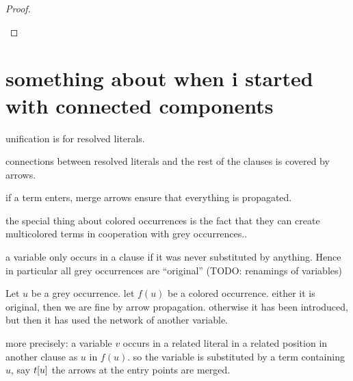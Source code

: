\documentclass[,%
	paper=a4,%
	DIV11, %
	twoside=false,%
	liststotoc,
	bibtotoc,
	draft=false,%
	numbers=noendperiod
]{scrartcl}
\begin{document}
\begin{proof}
\begin{description}
\begin{comment}
						We distinguish based on the shape $s$:
						\begin{itemize}
							\item $s$ is a grey or $\Delta$-colored term containing a $\Delta$-term.
								Then a $\Delta$-term is introduced into a $\Gamma$-term by means of unification, so by the respective case of the proof, there is an arrow from an appropriate lifting variable to~$t$.

							\item $s$ is a multicolored $\Gamma$-term.
								Then by Remark~\substremarkref, we can assume that an appropriate arrow pointing to $t$ exists.
						\end{itemize}
					\item $t$ is a $\Gamma$-term containing a $\Delta$-term.
				\end{itemize}
			\end{comment}


	\end{description}

\end{proof}

\section*{something about when i started with connected components}

unification is for resolved literals.

connections between resolved literals and the rest of the clauses is covered by arrows.

if a term enters, merge arrows ensure that everything is propagated.

the special thing about colored occurrences is the fact that they can create multicolored terms in cooperation with grey occurrences..

a variable only occurs in a clause if it was never substituted by anything. Hence in particular all grey occurrences are ``original'' (TODO: renamings of variables)

Let $u$ be a grey occurrence.
let $f(u)$ be a colored occurrence.
either it is original, then we are fine by arrow propagation.
otherwise it has been introduced, but then it has used the network of another variable.

more precisely: %
a variable $v$ occurs in a related literal in a related position in another clause as $u$ in $f(u)$.
so the variable is substituted by a term containing $u$, say $t[u]$
the arrows at the entry points are merged.
\end{document}

